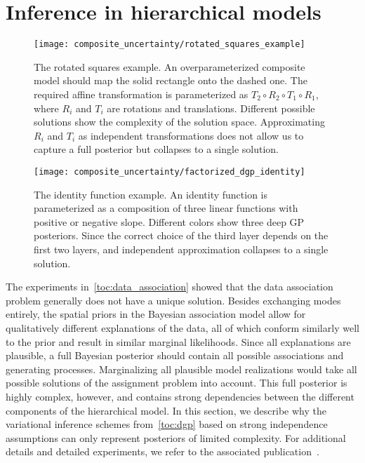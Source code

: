 \section{Inference in hierarchical models}
\label{toc:discussion:composition}
\begin{figure}[t]
    \centering
    \texttt{[image: composite\_uncertainty/rotated\_squares\_example]}
    \caption[Rotated squares example]{
        \label{fig:composition:rotated_squares_example}
        The rotated squares example.
        An overparameterized composite model should map the solid rectangle onto the dashed one.
        The required affine transformation is parameterized as $T_2 \circ R_2 \circ T_1 \circ R_1$, where $R_i$ and $T_i$ are rotations and translations.
        Different possible solutions show the complexity of the solution space.
        Approximating $R_i$ and $T_i$ as independent transformations does not allow us to capture a full posterior but collapses to a single solution.
    }
\end{figure}
\begin{figure}[t]
    \centering
    \texttt{[image: composite\_uncertainty/factorized\_dgp\_identity]}
    \caption[Three layer identity function]{
        \label{fig:composition:identity_factorised}
        The identity function example.
        An identity function is parameterized as a composition of three linear functions with positive or negative slope.
        Different colors show three deep GP posteriors.
        Since the correct choice of the third layer depends on the first two layers, and independent approximation collapses to a single solution.
    }
\end{figure}
The experiments in~\cref{toc:data_association} showed that the data association problem generally does not have a unique solution.
Besides exchanging modes entirely, the spatial priors in the Bayesian association model allow for qualitatively different explanations of the data, all of which conform similarly well to the prior and result in similar marginal likelihoods.
Since all explanations are plausible, a full Bayesian posterior should contain all possible associations and generating processes.
Marginalizing all plausible model realizations would take all possible solutions of the assignment problem into account.
This full posterior is highly complex, however, and contains strong dependencies between the different components of the hierarchical model.
In this section, we describe why the variational inference schemes from~\cref{toc:dgp} based on strong independence assumptions can only represent posteriors of limited complexity.
For additional details and detailed experiments, we refer to the associated publication~\parencite{ustyuzhaninov_compositional_2020}.

